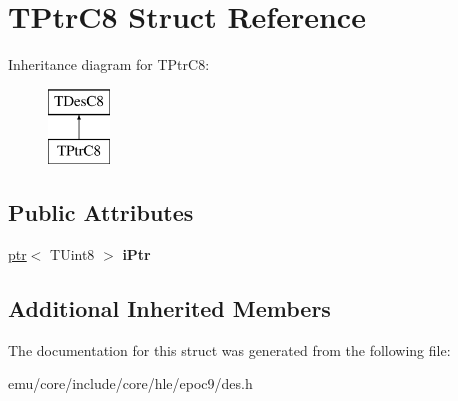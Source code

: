 \hypertarget{struct_t_ptr_c8}{}\section{T\+Ptr\+C8 Struct Reference}
\label{struct_t_ptr_c8}
Inheritance diagram for T\+Ptr\+C8\+:\begin{figure}[H]
\begin{center}
\leavevmode
\includegraphics[height=2.000000cm]{struct_t_ptr_c8}
\end{center}
\end{figure}
\subsection*{Public Attributes}
\begin{DoxyCompactItemize}
\item 
\mbox{\label{struct_t_ptr_c8_ab8c937b2d285767cf85df9637e65396a}} 
\mbox{\hyperlink{classeka2l1_1_1ptr}{ptr}}$<$ T\+Uint8 $>$ {\bfseries i\+Ptr}
\end{DoxyCompactItemize}
\subsection*{Additional Inherited Members}


The documentation for this struct was generated from the following file\+:\begin{DoxyCompactItemize}
\item 
emu/core/include/core/hle/epoc9/des.\+h\end{DoxyCompactItemize}
